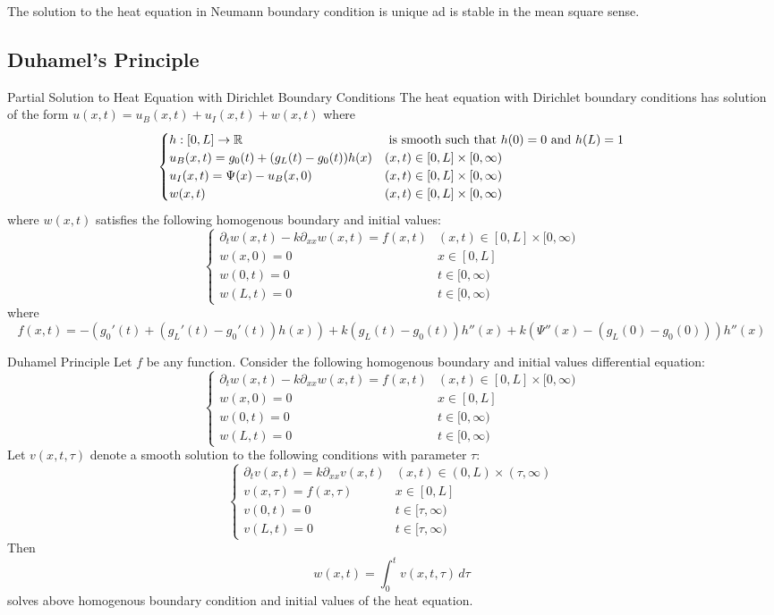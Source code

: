 \documentclass[a4paper]{article}
\begin{document}
\begin{prp}{}{} The solution to the heat equation in Neumann boundary condition is unique ad is stable in the mean square sense. 
\end{prp}

\subsection{Duhamel's Principle}
\begin{thm}{Partial Solution to Heat Equation with Dirichlet Boundary Conditions}{} The heat equation with Dirichlet boundary conditions has solution of the form $u(x,t)=u_B(x,t)+u_I(x,t)+w(x,t)$ where $$\begin{cases}
h:[0,L]\to\mathbb{R} & \text{ is smooth such that }h(0)=0\text{ and }h(L)=1\\
u_B(x,t)=g_0(t)+(g_L(t)-g_0(t))h(x) & (x,t)\in[0,L]\times[0,\infty)\\
u_I(x,t)=\Psi(x)-u_B(x,0) & (x,t)\in[0,L]\times[0,\infty)\\
w(x,t) & (x,t)\in[0,L]\times[0,\infty)
\end{cases}$$ where $w(x,t)$ satisfies the following homogenous boundary and initial values: $$\begin{cases}
\partial_{t}w(x,t)-k\partial_{xx}w(x,t)=f(x,t) & (x,t)\in[0,L]\times[0,\infty)\\
w(x,0)=0 & x\in[0,L]\\
w(0,t)=0 & t\in[0,\infty)\\
w(L,t)=0 & t\in[0,\infty)
\end{cases}$$ where $$f(x,t)=-(g_0'(t)+(g_L'(t)-g_0'(t))h(x))+k(g_L(t)-g_0(t))h''(x)+k(\Psi''(x)-(g_L(0)-g_0(0)))h''(x)$$
\end{thm}

\begin{thm}{Duhamel Principle}{} Let $f$ be any function. Consider the following homogenous boundary and initial values differential equation: $$\begin{cases}
\partial_{t}w(x,t)-k\partial_{xx}w(x,t)=f(x,t) & (x,t)\in[0,L]\times[0,\infty)\\
w(x,0)=0 & x\in[0,L]\\
w(0,t)=0 & t\in[0,\infty)\\
w(L,t)=0 & t\in[0,\infty)
\end{cases}$$
Let $v(x,t,\tau)$ denote a smooth solution to the following conditions with parameter $\tau$: $$\begin{cases}
\partial_tv(x,t)=k\partial_{xx}v(x,t) & (x,t)\in(0,L)\times(\tau,\infty)\\
v(x,\tau)=f(x,\tau) & x\in[0,L]\\
v(0,t)=0 & t\in[\tau,\infty)\\
v(L,t)=0 & t\in[\tau,\infty)
\end{cases}$$
Then $$w(x,t)=\int_0^t v(x,t,\tau)\,d\tau$$ solves above homogenous boundary condition and initial values of the heat equation. 
\end{thm}
\end{document}
